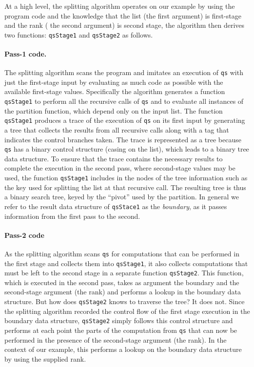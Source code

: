 \begin{abstrsyn}
At a high level, the splitting algorithm operates on our example by
using the program code and the knowledge that the list (the first
argument) is first-stage and the rank ( the second argument) is second
stage, the algorithm then derives two functions: \texttt{qsStage1} and
\texttt{qsStage2} as follows.


\paragraph{Pass-1 code.}
The splitting algorithm scans the program and imitates an execution of
\texttt{qs} with just the first-stage input by evaluating as much code
as possible with the available first-stage values.  Specifically the
algorithm generates a function \texttt{qsStage1} to perform all the
recursive calls of \texttt{qs} and to evaluate all instances of the
partition function, which depend only on the input list.  The function
\texttt{qsStage1} produces a trace of the execution of \texttt{qs} on
its first input by generating a tree that collects the results from
all recursive calls along with a tag that indicates the control
branches taken.  The trace is represented as a tree because
\texttt{qs} has a binary control structure (casing on the list), which
leads to a binary tree data structure.  To ensure that the trace
contains the necessary results to complete the execution in the second
pass, where second-stage values may be used, the function
\texttt{qsStage1} includes in the nodes of the tree information such
as the key used for splitting the list at that recursive call.  The
resulting tree is thus a binary search tree, keyed by the ``pivot''
used by the partition.  In general we refer to the result data
structure of \texttt{qsStace1} as the {\em boundary}, as it passes
information from the first pass to the second.

\paragraph{Pass-2 code}
As the splitting algorithm scans \texttt{qs} for computations that can
be performed in the first stage and collects them into
\texttt{qsStage1}, it also collects computations that must be left to
the second stage in a separate function \texttt{qsStage2}.  This
function, which is executed in the second pass, takes as argument the
boundary and the second-stage argument (the rank) and performs a
lookup in the boundary data structure.  But how does \texttt{qsStage2}
knows to traverse the tree? It does not. Since the splitting algorithm
recorded the control flow of the first stage execution in the boundary
data structure, \texttt{qsStage2} simply follows this control
structure and performs at each point the parts of the computation from
\texttt{qs} that can now be performed in the presence of the
second-stage argument (the rank).  In the context of our example, this
performs a lookup on the boundary data structure by using the supplied
rank.  


\end{abstrsyn}
